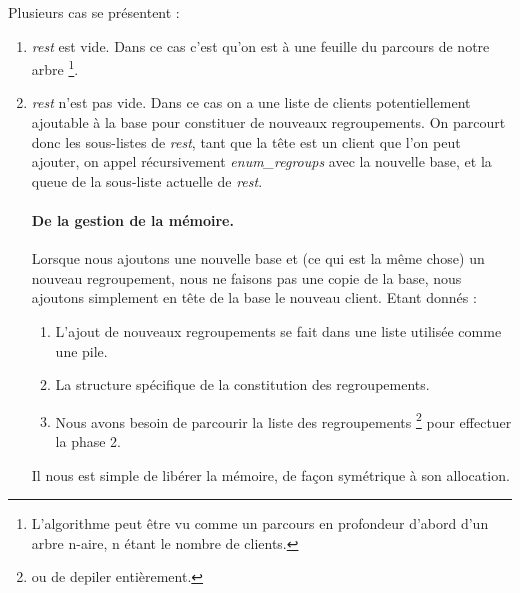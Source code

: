 \documentclass[a4paper,10pt]{article}
\begin{document}
Plusieurs cas se présentent :
\begin{enumerate}
\item \emph{rest} est vide. Dans ce cas c'est qu'on est à une feuille du parcours de notre arbre
  \footnote{L'algorithme peut être vu comme un parcours en profondeur d'abord d'un arbre n-aire, n étant le nombre
  de clients.}.
\item \emph{rest} n'est pas vide. Dans ce cas on a une liste de clients potentiellement ajoutable à la base pour constituer
  de nouveaux regroupements. On parcourt donc les sous-listes de \emph{rest}, tant que la tête est un client que l'on peut
  ajouter, on appel récursivement \emph{enum\_regroups} avec la nouvelle base, et la queue de la sous-liste actuelle de
  \emph{rest}. 
  

\paragraph{De la gestion de la mémoire.}

Lorsque nous ajoutons une nouvelle base et (ce qui est la même chose) un nouveau regroupement, nous ne faisons pas une copie
de la base, nous ajoutons simplement en tête de la base le nouveau client. Etant donnés :
\begin{enumerate}
  \item L'ajout de nouveaux regroupements se fait dans une liste utilisée comme une pile.
  \item La structure spécifique de la constitution des regroupements.
  \item Nous avons besoin de parcourir la liste des regroupements
    \footnote{ou de depiler entièrement.} pour effectuer la phase 2.
\end{enumerate}
Il nous est simple de libérer la mémoire, de façon symétrique à son allocation.


\end{enumerate}
\end{document}
